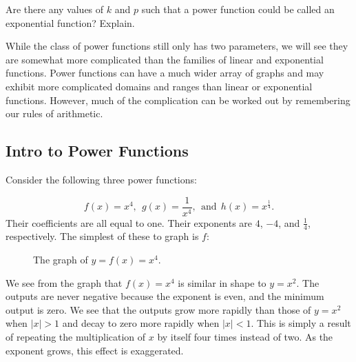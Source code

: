 \begin{eg}
\par

\begin{question} Are there any values of $k$ and $p$ such that a power function could be called an exponential function? Explain.
\end{question}

\par

While the class of power functions still only has two parameters, we will see they are somewhat more complicated than the families of linear and exponential functions. Power functions can have a much wider array of graphs and may exhibit more complicated domains and ranges than linear or exponential functions. However, much of the complication can be worked out by remembering our rules of arithmetic.

\subsection{Intro to Power Functions}

Consider the following three power functions:

\[
f(x) = x^{4},\ \ g(x) = \frac{1}{x^4},\ \ \mbox{and}\ \ h(x) = x^{\frac{1}{4}}.
\]
Their coefficients are all equal to one. Their exponents are $4$, $-4$, and $\frac{1}{4}$, respectively. The simplest of these to graph is $f$:


\begin{figure}[h]
\centering
{} 
\caption{The graph of $y=f(x) = x^4$.}
\end{figure}

We see from the graph that $f(x) = x^4$ is similar in shape to $y = x^2$. The outputs are never negative because the exponent is even, and the minimum output is zero. We see that the outputs grow more rapidly than those of $y = x^2$ when $|x|>1$ and decay to zero more rapidly when $|x|<1$. This is simply a result of repeating the multiplication of $x$ by itself four times instead of two. As the exponent grows, this effect is exaggerated. 



\end{eg}
